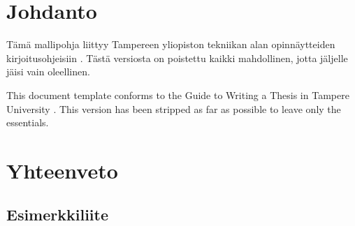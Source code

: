 \documentclass{tauthesis}
\begin{document}


\listoffigures
\listoftables


\glossary


\mainmatter

\chapter{Johdanto}
\label{ch:johdanto}

Tämä mallipohja liittyy Tampereen yliopiston tekniikan alan opinnäytteiden kirjoitusohjeisiin \parencite{kirjoitusohje2018}.
Tästä versiosta on poistettu kaikki mahdollinen, jotta jäljelle jäisi vain oleellinen.

This document template conforms to the Guide to Writing a Thesis in Tampere University \parencite{thesisguide2018}.
This version has been stripped as far as possible to leave only the essentials.


\chapter{Yhteenveto}
\label{ch:yhteenveto}



\printbibliography[heading=bibintoc]



\begin{appendices}

\chapter{Esimerkkiliite}
\label{ch:liite}


\end{appendices}
\end{document}
